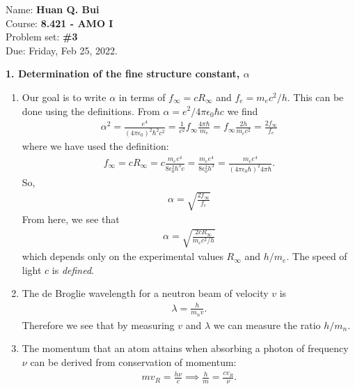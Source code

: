 \documentclass{article}
\theoremstyle{definition}
\newcommand{\al}{\alpha}
\newcommand{\f}[2]{\frac{#1}{#2}}
\begin{document}
\begin{framed}
\noindent Name: \textbf{Huan Q. Bui}\\
Course: \textbf{8.421 - AMO I}\\
Problem set: \textbf{\#3}\\
Due: Friday, Feb 25, 2022.
\end{framed}
	
	
\noindent \textbf{1. Determination of the fine structure constant, $\al$}


\begin{enumerate}[label=(\alph*)]
	\item Our goal is to write $\al$ in terms of $f_\infty = cR_\infty$ and $f_e = m_ec^2/h$. This can be done using the definitions. From $\al =e^2/4\pi \epsilon_0 \hbar c$ we find 
	\begin{align*}
	\al^2 = \f{e^4}{(4\pi \epsilon_0)^2 \hbar^2 c^2} = \f{1}{c^2} f_\infty \f{4\pi \hbar}{m_e} = f_\infty \f{2h}{m_ec^2} = \f{2f_\infty}{f_e}
	\end{align*} 
	where we have used the definition:
	\begin{align*}
	f_\infty = c R_\infty = c\f{m_ee^4}{8 \epsilon_0^2 h^3 c }  =\f{m_ee^4}{8 \epsilon_0^2 h^3 } = \f{m_ee^4}{(4\pi\epsilon_0 \hbar )^2 4\pi \hbar }.
	\end{align*}
	So, 
	\begin{align*}
	\boxed{\al = \sqrt{\f{2f_\infty}{f_e} }}
	\end{align*}
	From here, we see that 
	\begin{align*}
	\al = \sqrt{\f{2cR_\infty}{m_e c^2/h}}
	\end{align*}
	which depends only on the experimental values $R_\infty$ and $h/m_e$. The speed of light $c$ is \textit{defined}. 
	
	
	
	
	\item The de Broglie wavelength for a neutron beam of velocity $v$ is 
	\begin{align*}
	\lambda = \f{h}{m_n v}. 
	\end{align*}
	Therefore we see that by measuring $v$ and $\lambda$ we can measure the ratio $h/m_n$. 
	
	\item The momentum that an atom attains when absorbing a photon of frequency $\nu$ can be derived from conservation of momentum: 
	\begin{align*}
	mv_R = \f{h\nu}{c} \implies \f{h}{m} = \f{cv_R}{\nu}.
	\end{align*}
	

\end{enumerate}
\end{document}
